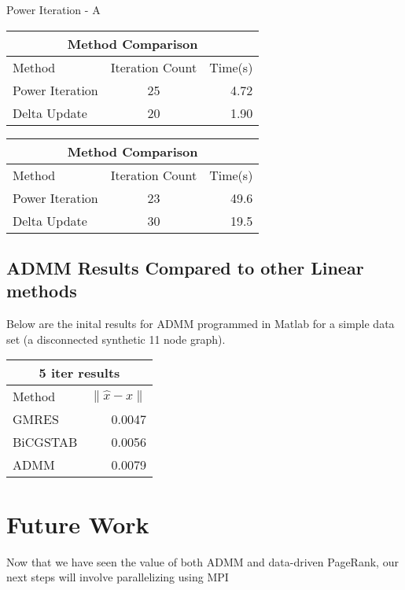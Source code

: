 \documentclass[letterpaper,12pt,onecolumn]{article}
\begin{document}
\begin{center}
\caption{Power Iteration - A}
\begin{tabular}{l || c | r}
	\hline
	\multicolumn{3}{c}{Method Comparison} \\
	\hline\hline
	Method & Iteration Count & Time(s) \\
	\hline\hline
	Power Iteration & 25 & 4.72 \\
	Delta Update & 20 & 1.90 \\
\end{tabular}
\end{center}


\begin{center}
\begin{tabular}{l || c | r}
	\hline
	\multicolumn{3}{c}{Method Comparison} \\
	\hline\hline
	Method & Iteration Count & Time(s) \\
	\hline\hline
	Power Iteration & 23 & 49.6 \\
	Delta Update & 30 & 19.5 \\
\end{tabular}
\end{center}
\subsection{ADMM Results Compared to other Linear methods}
Below are the inital results for ADMM programmed in Matlab for a simple data set (a disconnected synthetic 11 node graph). 

\begin{center}
\begin{tabular}{l || r}
	\hline\hline
	\multicolumn{2}{c}{5 iter results} \\
	\hline\hline
	Method  & $\|\hat{x} - x\| $ \\
	\hline
	GMRES & 0.0047  \\
	BiCGSTAB & 0.0056  \\
	ADMM & 0.0079  \\
\end{tabular}
\end{center}


\section{Future Work}

Now that we have seen the value of both ADMM and data-driven PageRank, our next steps will involve parallelizing using MPI
\end{document}

